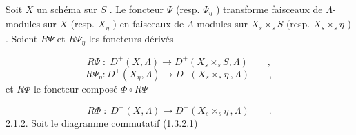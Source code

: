 
Soit $X$ un schéma sur $S$ . Le foncteur $\Psi$ (resp. $\Psi_{\eta}$ ) transforme faisceaux de $\Lambda$-modules sur $X$ (resp. $X_{\eta}$ ) en faisceaux de $\Lambda$-modules sur $X_s \times_s S$ (resp. $X_s \times_s \eta$ ) . Soient $R\Psi$ et $R\Psi_{\eta}$ les foncteurs dérivés

\begin{equation*}
R\Psi \;:\; D^{+}(X, \Lambda) \longrightarrow D^{+}(X_s \times_s S, \Lambda) \qquad ,
\end{equation*}
\begin{equation*}
R\Psi_{\eta}\colon D^{+}(X_{\eta}, \Lambda) \longrightarrow D^{+} (X_s \times_s \eta \,, \Lambda ) \qquad ,
\end{equation*}
et $R\Phi$ le foncteur composé $\Phi \circ R\Psi$

\begin{equation*}
R\Phi \;:\; D^{+}(X, \Lambda) \longrightarrow D^{+}(X_s \times_s \eta \,, \Lambda) \qquad .
\end{equation*}
2.1.2. Soit le diagramme commutatif (1.3.2.1)

